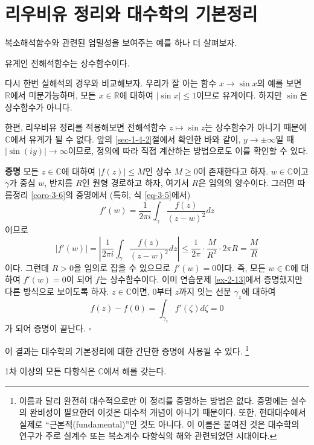 \section{리우비유 정리와 대수학의 기본정리}

복소해석함수와 관련된 엄밀성을 보여주는 예를 하나 더 살펴보자.

\begin{salt_theorem} \label{thm-3-7}
유계인 전해석함수는 상수함수이다.
\end{salt_theorem}

다시 한번 실해석의 경우와 비교해보자.
우리가 잘 아는 함수 $x\to \sin x$의 예를 보면
$\mathbb R$에서 미분가능하며,
모든 $x\in\mathbb R$에 대하여 $|\sin x|\le 1$이므로 
유계이다.
하지만 $\sin$은 상수함수가 아니다.

한편, 리우비유 정리를 적용해보면
전해석함수 $z\mapsto \sin z$는 상수함수가 아니기 때문에
$\mathbb C$에서 유계가 될 수 없다.
앞의 \ref{sec-1-4-2}절에서 확인한 바와 같이,
$y\to\pm\infty$일 때 $|\sin(iy)| \to \infty$이므로,
정의에 따라 직접 계산하는 방법으로도 이를 확인할 수 있다.

{\bf 증명}
모든 $z\in \mathbb C$에 대하여 $|f(z)|\le M$인
상수 $M\ge0$이 존재한다고 하자.
$w\in\mathbb C$이고 $\gamma$가 중심 $w$, 반지름 $R$인 원형 경로하고 하자, 
여기서 $R$은 임의의 양수이다.
그러면 따름정리 \ref{coro-3-6}의 증명에서 (특히, 식 \eqref{eq-3-5}에서)
\[
f'(w) = \dfrac1{2\pi i} \int_\gamma \dfrac{f(z)}{(z-w)^2}dz
\]
이므로
\[
|f'(w)| = \left| \dfrac1{2\pi i} \int_\gamma \dfrac{f(z)}{(z-w)^2}dz \right|
\le \dfrac1{2\pi}\cdot \dfrac M{R^2}\cdot 2\pi R = \dfrac MR
\]
이다.
그런데 $R>0$을 임의로 잡을 수 있으므로 $f'(w)=0$이다.
즉, 모든 $w\in\mathbb C$에 대하여 $f'(w)=0$이 되어 $f$는 상수함수이다.
이미 연습문제 \ref{ex-2-13}에서 증명했지만 다른 방식으로 보이도록 하자.
$z\in\mathbb C$이면, $0$부터 $z$까지 잇는 선분 $\gamma_z$에 대하여
\[
f(z) - f(0) = \int_{\gamma_z} f'(\zeta)d\zeta = 0
\]
가 되어 증명이 끝난다.
\hfill $\square$

이 결과는 대수학의 기본정리에 대한 간단한 증명에 사용될 수 있다.
\footnote{
이름과 달리 완전히 대수적으로만 이 정리를 증명하는 방법은 없다.
증명에는 실수의 완비성이 필요한데 이것은 대수적 개념이 아니기 때문이다.
또한, 현대대수에서 실제로 ``근본적(fundamental)''인 것도 아니다.
이 이름은 붙여진 것은 대수학의 연구가 주로 실계수 또는 복소계수 다항식의 해와 관련되었던
시대이다.}

\begin{salt_corollary}  \label{coro-3-7}
1차 이상의 모든 다항식은 $\mathbb C$에서 해를 갖는다.
\end{salt_corollary}

